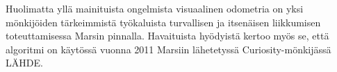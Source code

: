 \documentclass[finnish]{tktltiki2}
\theoremstyle{definition}
\theoremstyle{remark}
\begin{document}
Huolimatta yllä mainituista ongelmista visuaalinen odometria on yksi mönkijöiden tärkeimmistä työkaluista turvallisen ja itsenäisen liikkumisen toteuttamisessa Marsin pinnalla. Havaituista hyödyistä kertoo myös se, että algoritmi on käytössä vuonna 2011 Marsiin lähetetyssä Curiosity-mönkijässä LÄHDE.







% 
\end{document}
